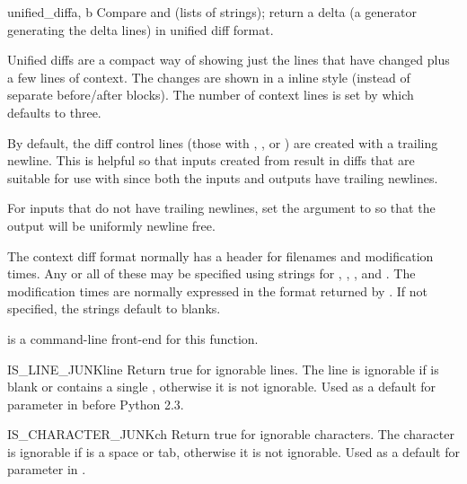 \begin{funcdesc}{unified_diff}{a, b}
  Compare  and  (lists of strings); return a
  delta (a generator generating the delta lines) in unified diff
  format.
  
  Unified diffs are a compact way of showing just the lines that have
  changed plus a few lines of context.  The changes are shown in a
  inline style (instead of separate before/after blocks).  The number
  of context lines is set by  which defaults to three.

  By default, the diff control lines (those with \code{---}, \code{+++},
  or ) are created with a trailing newline.  This is helpful so
  that inputs created from  result in diffs
  that are suitable for use with  since both
  the inputs and outputs have trailing newlines.

  For inputs that do not have trailing newlines, set the 
  argument to  so that the output will be uniformly newline free.

  The context diff format normally has a header for filenames and
  modification times.  Any or all of these may be specified using strings for
  , , , and .
  The modification times are normally expressed in the format returned by
  .  If not specified, the strings default to blanks.

   is a command-line front-end for this
  function.

\end{funcdesc} 

\begin{funcdesc}{IS_LINE_JUNK}{line}
  Return true for ignorable lines.  The line  is ignorable
  if  is blank or contains a single \character{\#},
  otherwise it is not ignorable.  Used as a default for parameter
   in  before Python 2.3.
\end{funcdesc}


\begin{funcdesc}{IS_CHARACTER_JUNK}{ch}
  Return true for ignorable characters.  The character  is
  ignorable if  is a space or tab, otherwise it is not
  ignorable.  Used as a default for parameter  in
  .
\end{funcdesc}


